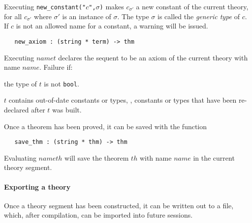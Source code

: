 \noindent Executing {\small\verb+new_constant("+}$c${\small\verb+",+}$\sigma${\small\verb+)+} makes
$c_{\sigma'}$ a new constant of the current theory,
for all $c_{\sigma'}$ where $\sigma'$ is an instance of $\sigma$.
The type $\sigma$ is
called the {\it generic type\/} of $c$.
If $c$ is not an allowed name for a constant, a warning will be issued.

\begin{boxed}
\begin{verbatim}
   new_axiom : (string * term) -> thm
\end{verbatim}
\end{boxed}

\noindent Executing $name$$t$\ml{)} declares the
sequent
 to be an axiom of the current theory with name $name$.
Failure if:
\begin{myenumerate}
\item the type of $t$ is not \verb+bool+.

\item $t$ contains out-of-date constants or types, \ie, constants or
  types that have been re-declared after $t$ was built.
\end{myenumerate}

Once a theorem has been proved, it can be saved with the function

\begin{boxed}
\begin{verbatim}
   save_thm : (string * thm) -> thm
\end{verbatim}
\end{boxed}

\noindent
Evaluating $\mathit{name}$$\mathit{th}$\ml{)}
will save the theorem
%
%
$\mathit{th}$ with name $\mathit{name}$ in the current theory
segment.

\paragraph{Exporting a theory}

Once a theory segment has been constructed, it can be written out to a
file, which, after compilation, can be imported into future sessions.

